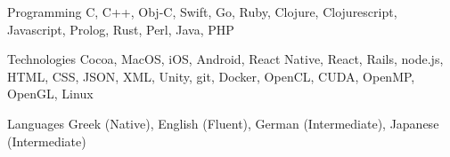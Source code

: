 

\begin{cvskills}

  \cvskill
    {Programming} %
    {C, C++, Obj-C, Swift, Go, Ruby, Clojure, Clojurescript, Javascript, Prolog, Rust, Perl, Java, PHP} %

  \cvskill
    {Technologies} %
    {Cocoa, MacOS, iOS, Android, React Native, React, Rails, node.js, HTML, CSS, JSON, XML, Unity, git, Docker, OpenCL, CUDA, OpenMP, OpenGL, Linux} %

  \cvskill
    {Languages} %
    {Greek (Native), English (Fluent), German (Intermediate), Japanese (Intermediate)} %

\end{cvskills}
